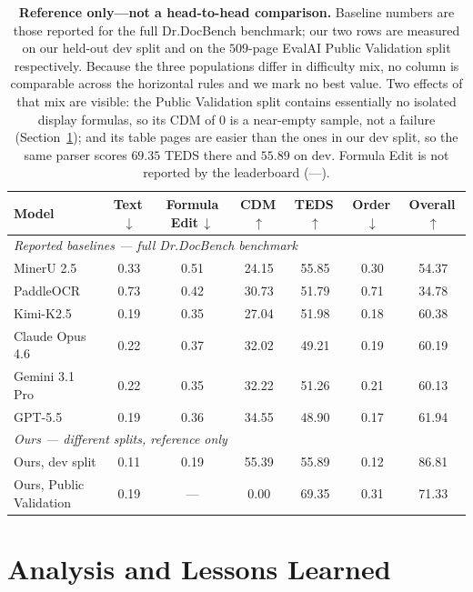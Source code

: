 \documentclass[11pt]{article}
\begin{document}
\begin{table}[t]
\centering
\small
\begin{tabular}{lcccccc}
\toprule
Model & Text\,$\downarrow$ & Formula Edit\,$\downarrow$ & CDM\,$\uparrow$ & TEDS\,$\uparrow$ & Order\,$\downarrow$ & Overall\,$\uparrow$ \\
\midrule
\multicolumn{7}{l}{\emph{Reported baselines --- full Dr.DocBench benchmark}} \\
MinerU 2.5 & 0.33 & 0.51 & 24.15 & 55.85 & 0.30 & 54.37 \\
PaddleOCR & 0.73 & 0.42 & 30.73 & 51.79 & 0.71 & 34.78 \\
Kimi-K2.5 & 0.19 & 0.35 & 27.04 & 51.98 & 0.18 & 60.38 \\
Claude Opus 4.6 & 0.22 & 0.37 & 32.02 & 49.21 & 0.19 & 60.19 \\
Gemini 3.1 Pro & 0.22 & 0.35 & 32.22 & 51.26 & 0.21 & 60.13 \\
GPT-5.5 & 0.19 & 0.36 & 34.55 & 48.90 & 0.17 & 61.94 \\
\midrule
\multicolumn{7}{l}{\emph{Ours --- different splits, reference only}} \\
Ours, dev split & 0.11 & 0.19 & 55.39 & 55.89 & 0.12 & 86.81 \\
Ours, Public Validation & 0.19 & --- & 0.00 & 69.35 & 0.31 & 71.33 \\
\bottomrule
\end{tabular}
\caption{\textbf{Reference only---not a head-to-head comparison.} Baseline numbers
are those reported for the full Dr.DocBench benchmark; our two rows are measured on
our held-out dev split and on the $509$-page EvalAI Public Validation split
respectively. Because the three populations differ in difficulty mix, no column is
comparable across the horizontal rules and we mark no best value. Two effects of
that mix are visible: the Public Validation split contains essentially no isolated
display formulas, so its CDM of $0$ is a near-empty sample, not a failure
(Section~\ref{sec:analysis}); and its table pages are easier than the ones in our
dev split, so the same parser scores $69.35$ TEDS there and $55.89$ on dev. Formula
Edit is not reported by the leaderboard (---).}
\label{tab:compare}
\end{table}

\section{Analysis and Lessons Learned}
\label{sec:analysis}
\end{document}
